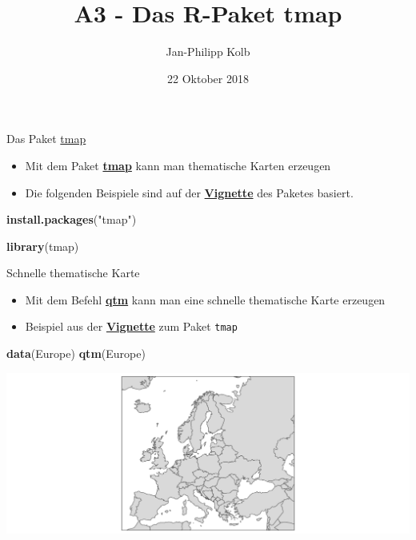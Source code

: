 \documentclass[ignorenonframetext,]{beamer}
\title{A3 - Das R-Paket tmap}
\author{Jan-Philipp Kolb}
\date{22 Oktober 2018}
\newenvironment{Shaded}{\begin{snugshade}}{\end{snugshade}}
\newcommand{\KeywordTok}[1]{\textcolor[rgb]{0.13,0.29,0.53}{\textbf{#1}}}
\newcommand{\StringTok}[1]{\textcolor[rgb]{0.31,0.60,0.02}{#1}}
\newcommand{\NormalTok}[1]{#1}
\providecommand{\tightlist}{%
  \setlength{\itemsep}{0pt}\setlength{\parskip}{0pt}}
\begin{document}
\frame{\titlepage}

\begin{frame}[fragile]{Das Paket
\href{https://cran.r-project.org/web/packages/tmap/index.html}{tmap}}

\begin{itemize}
\tightlist
\item
  Mit dem Paket
  \href{http://twitter.com/sharon000/status/593028906820599808/photo/1?ref_src=twsrc\%5Etfw}{\textbf{tmap}}
  kann man thematische Karten erzeugen
\item
  Die folgenden Beispiele sind auf der
  \href{https://cran.r-project.org/web/packages/tmap/vignettes/tmap-nutshell.html}{\textbf{Vignette}}
  des Paketes basiert.
\end{itemize}

\begin{Shaded}
\begin{Highlighting}[]
\KeywordTok{install.packages}\NormalTok{(}\StringTok{"tmap"}\NormalTok{)}
\end{Highlighting}
\end{Shaded}

\begin{Shaded}
\begin{Highlighting}[]
\KeywordTok{library}\NormalTok{(tmap)}
\end{Highlighting}
\end{Shaded}

\end{frame}

\begin{frame}[fragile]{Schnelle thematische Karte}

\begin{itemize}
\item
  Mit dem Befehl
  \href{https://cran.r-project.org/web/packages/tmap/vignettes/tmap-nutshell.html}{\textbf{qtm}}
  kann man eine schnelle thematische Karte erzeugen
\item
  Beispiel aus der
  \href{https://cran.r-project.org/web/packages/tmap/vignettes/tmap-nutshell.html}{\textbf{Vignette}}
  zum Paket \texttt{tmap}
\end{itemize}

\begin{Shaded}
\begin{Highlighting}[]
\KeywordTok{data}\NormalTok{(Europe)}
\KeywordTok{qtm}\NormalTok{(Europe)}
\end{Highlighting}
\end{Shaded}

\includegraphics{tmap_files/figure-beamer/unnamed-chunk-4-1.pdf}

\end{frame}
\end{document}
